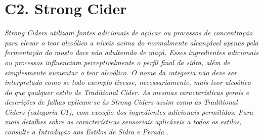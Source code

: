 \section*{C2. Strong Cider}
\textit{Strong Ciders utilizam fontes adicionais de açúcar ou processos de concentração para elevar o teor alcoólico a níveis acima do normalmente alcançável apenas pela fermentação do mosto doce não adulterado de maçã. Esses ingredientes adicionais ou processos influenciam perceptivelmente o perfil final da sidra, além de simplesmente aumentar o teor alcoólico. O nome da categoria não deve ser interpretado como se todo exemplo tivesse, necessariamente, mais teor alcoólico do que qualquer estilo de Traditional Cider. As mesmas características gerais e descrições de falhas aplicam-se às Strong Ciders assim como às Traditional Ciders (categoria C1), com exceção dos ingredientes adicionais permitidos. Para mais detalhes sobre as características sensoriais aplicáveis a todos os estilos, consulte a Introdução aos Estilos de Sidra e Perada..}